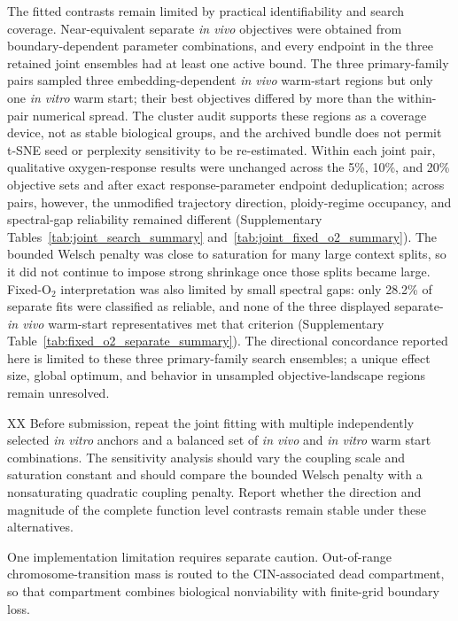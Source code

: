 \documentclass[11pt]{article}
\begin{document}
The fitted contrasts remain limited by practical identifiability and search coverage. Near-equivalent separate \textit{in vivo} objectives were obtained from boundary-dependent parameter combinations, and every endpoint in the three retained joint ensembles had at least one active bound. The three primary-family pairs sampled three embedding-dependent \textit{in vivo} warm-start regions but only one \textit{in vitro} warm start; their best objectives differed by more than the within-pair numerical spread. The cluster audit supports these regions as a coverage device, not as stable biological groups, and the archived bundle does not permit t-SNE seed or perplexity sensitivity to be re-estimated. Within each joint pair, qualitative oxygen-response results were unchanged across the 5\%, 10\%, and 20\% objective sets and after exact response-parameter endpoint deduplication; across pairs, however, the unmodified trajectory direction, ploidy-regime occupancy, and spectral-gap reliability remained different (Supplementary Tables~\ref{tab:joint_search_summary} and~\ref{tab:joint_fixed_o2_summary}). The bounded Welsch penalty was close to saturation for many large context splits, so it did not continue to impose strong shrinkage once those splits became large. Fixed-O$_2$ interpretation was also limited by small spectral gaps: only 28.2\% of separate fits were classified as reliable, and none of the three displayed separate-\textit{in vivo} warm-start representatives met that criterion (Supplementary Table~\ref{tab:fixed_o2_separate_summary}). The directional concordance reported here is limited to these three primary-family search ensembles; a unique effect size, global optimum, and behavior in unsampled objective-landscape regions remain unresolved.

XX Before submission, repeat the joint fitting with multiple independently selected \textit{in vitro} anchors and a balanced set of \textit{in vivo} and \textit{in vitro} warm start combinations. The sensitivity analysis should vary the coupling scale and saturation constant and should compare the bounded Welsch penalty with a nonsaturating quadratic coupling penalty. Report whether the direction and magnitude of the complete function level contrasts remain stable under these alternatives.

One implementation limitation requires separate caution. Out-of-range chromosome-transition mass is routed to the CIN-associated dead compartment, so that compartment combines biological nonviability with finite-grid boundary loss.
\end{document}
